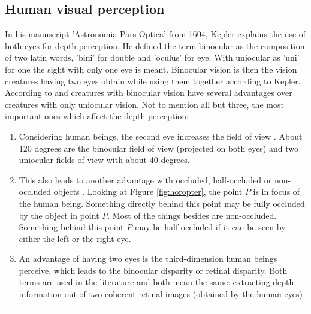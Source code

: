 \newpage

\subsection*{Human visual perception}

In his manuscript 'Astronomia Pars Optica' from 1604, Kepler explains the use of both eyes for depth perception.
He defined the term binocular as the composition of two latin words, 'bini' for double and 'oculus' for eye.
With uniocular as 'uni' for one the sight with only one eye is meant.
Binocular vision is then the vision creatures having two eyes obtain while using them together according to Kepler.
According to \citeauthor{fahle1987wozu} and \citeauthor{henson2000visual} creatures with binocular vision have several advantages over creatures with only uniocular vision.
Not to mention all but three, the most important ones which affect the depth perception:

\begin{enumerate}
  \item Considering human beings, the second eye increases the field of view \citep{henson2000visual}. About 120 degrees are the binocular field of view (projected on both eyes) and two uniocular fields of view with about 40 degrees.
  \item This also leads to another advantage with occluded, half-occluded or non-occluded objects \citep{fahle1987wozu}. Looking at Figure \ref{fig:horopter}, the point $P$ is in focus of the human being. Something directly behind this point may be fully occluded by the object in point $P$. Most of the things besides are non-occluded. Something behind this point $P$ may be half-occluded if it can be seen by either the left or the right eye.
  \item An advantage of having two eyes is the third-dimension human beings perceive, which leads to the binocular disparity or retinal disparity. Both terms are used in the literature and both mean the same: extracting depth information out of two coherent retinal images (obtained by the human eyes) \citep{cyganek2011introduction, fahle1987wozu}.
\end{enumerate}

